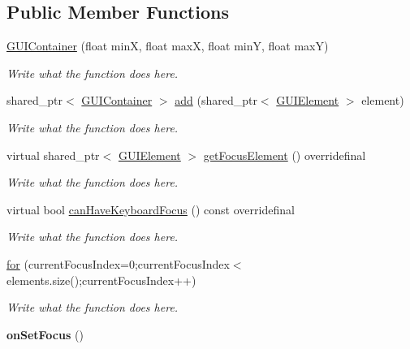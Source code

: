 \subsection*{Public Member Functions}
\begin{DoxyCompactItemize}
\item 
\hyperlink{classGUIContainer_aa35797f8b9c6a8e332ad5930faa69c00}{G\+U\+I\+Container} (float min\+X, float max\+X, float min\+Y, float max\+Y)
\begin{DoxyCompactList}\small\item\em Write what the function does here. \end{DoxyCompactList}\item 
shared\+\_\+ptr$<$ \hyperlink{classGUIContainer}{G\+U\+I\+Container} $>$ \hyperlink{classGUIContainer_a01f2cf647a23b37ed7d815a9780ef8f9}{add} (shared\+\_\+ptr$<$ \hyperlink{classGUIElement}{G\+U\+I\+Element} $>$ element)
\begin{DoxyCompactList}\small\item\em Write what the function does here. \end{DoxyCompactList}\item 
virtual shared\+\_\+ptr$<$ \hyperlink{classGUIElement}{G\+U\+I\+Element} $>$ \hyperlink{classGUIContainer_addf987ba650075a7c0f34c571debd6a2}{get\+Focus\+Element} () overridefinal
\begin{DoxyCompactList}\small\item\em Write what the function does here. \end{DoxyCompactList}\item 
virtual bool \hyperlink{classGUIContainer_a54bbf86cc92ce6518ccdc25a21b8e5f5}{can\+Have\+Keyboard\+Focus} () const overridefinal
\begin{DoxyCompactList}\small\item\em Write what the function does here. \end{DoxyCompactList}\item 
\hyperlink{classGUIContainer_a4b4204dd7429c4b803dbd49927636b8b}{for} (current\+Focus\+Index=0;current\+Focus\+Index$<$ elements.\+size();current\+Focus\+Index++)
\begin{DoxyCompactList}\small\item\em Write what the function does here. \end{DoxyCompactList}\item 
\hypertarget{classGUIContainer_a1b2a4a784e6440eed8b91941d8ae0820}{{\bfseries on\+Set\+Focus} ()}\label{classGUIContainer_a1b2a4a784e6440eed8b91941d8ae0820}

\end{DoxyCompactItemize}

